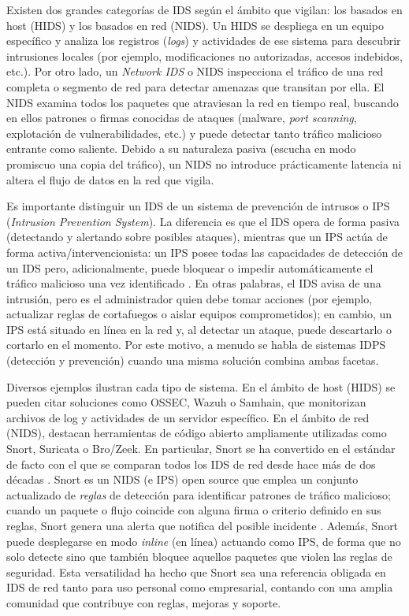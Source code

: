\documentclass[11pt,a4paper,twoside]{report}
\begin{document}
Existen dos grandes categorías de IDS según el ámbito que vigilan: los basados en host (HIDS) y los basados en red (NIDS). Un HIDS se despliega en un equipo específico y analiza los registros (\textit{logs}) y actividades de ese sistema para descubrir intrusiones locales (por ejemplo, modificaciones no autorizadas, accesos indebidos, etc.). Por otro lado, un \textit{Network IDS} o NIDS inspecciona el tráfico de una red completa o segmento de red para detectar amenazas que transitan por ella. El NIDS examina todos los paquetes que atraviesan la red en tiempo real, buscando en ellos patrones o firmas conocidas de ataques (malware, \textit{port scanning}, explotación de vulnerabilidades, etc.) y puede detectar tanto tráfico malicioso entrante como saliente. Debido a su naturaleza pasiva (escucha en modo promiscuo una copia del tráfico), un NIDS no introduce prácticamente latencia ni altera el flujo de datos en la red que vigila.\newline

Es importante distinguir un IDS de un sistema de prevención de intrusos o IPS (\textit{Intrusion Prevention System}). La diferencia es que el IDS opera de forma pasiva (detectando y alertando sobre posibles ataques), mientras que un IPS actúa de forma activa/intervencionista: un IPS posee todas las capacidades de detección de un IDS pero, adicionalmente, puede bloquear o impedir automáticamente el tráfico malicioso una vez identificado \cite{a2secure2019}. En otras palabras, el IDS avisa de una intrusión, pero es el administrador quien debe tomar acciones (por ejemplo, actualizar reglas de cortafuegos o aislar equipos comprometidos); en cambio, un IPS está situado en línea en la red y, al detectar un ataque, puede descartarlo o cortarlo en el momento. Por este motivo, a menudo se habla de sistemas IDPS (detección y prevención) cuando una misma solución combina ambas facetas.\newline

Diversos ejemplos ilustran cada tipo de sistema. En el ámbito de host (HIDS) se pueden citar soluciones como OSSEC, Wazuh o Samhain, que monitorizan archivos de log y actividades de un servidor específico. En el ámbito de red (NIDS), destacan herramientas de código abierto ampliamente utilizadas como Snort, Suricata o Bro/Zeek. En particular, Snort se ha convertido en el estándar de facto con el que se comparan todos los IDS de red desde hace más de dos décadas \cite{SnortBlog2011}. Snort es un NIDS (e IPS) open source que emplea un conjunto actualizado de \textit{reglas} de detección para identificar patrones de tráfico malicioso; cuando un paquete o flujo coincide con alguna firma o criterio definido en sus reglas, Snort genera una alerta que notifica del posible incidente \cite{CiscoSnort3Blog}. Además, Snort puede desplegarse en modo \textit{inline} (en línea) actuando como IPS, de forma que no solo detecte sino que también bloquee aquellos paquetes que violen las reglas de seguridad. Esta versatilidad ha hecho que Snort sea una referencia obligada en IDS de red tanto para uso personal como empresarial, contando con una amplia comunidad que contribuye con reglas, mejoras y soporte.\newline
\end{document}
